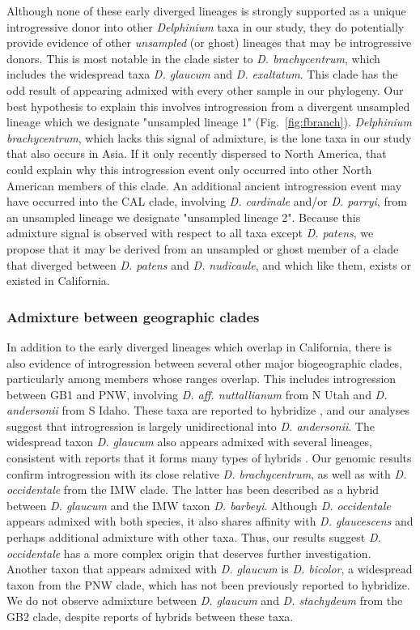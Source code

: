 \documentclass[11pt]{article}
\begin{document}
Although none of these early diverged lineages is strongly supported as a unique introgressive donor into other \emph{Delphinium} taxa in our study, they do potentially provide evidence of other \emph{unsampled} (or ghost) lineages that may be introgressive donors.
This is most notable in the clade sister to \emph{D. brachycentrum}, which includes 
the widespread taxa \emph{D. glaucum} and \emph{D. exaltatum}. 
This clade has the odd result of appearing admixed with every other sample in our 
phylogeny.
Our best hypothesis to explain this involves introgression from a divergent unsampled
lineage which we designate "unsampled lineage 1" (Fig.~\ref{fig:fbranch}). 
% 
\emph{Delphinium brachycentrum}, which lacks this signal of admixture, is the lone taxa in our
study that also occurs in Asia. If it only recently dispersed to North America, that 
could explain why this introgression event only occurred into other North American 
members of this clade.
% 
An additional ancient introgression event may have occurred into the CAL clade, 
involving \emph{D. cardinale} and/or \emph{D. parryi}, from an unsampled lineage we 
designate "unsampled lineage 2". Because this admixture signal is observed with respect to all taxa except \emph{D. patens}, we propose that it may be derived from an unsampled or ghost member of a clade that diverged between \emph{D. patens} and \emph{D. nudicaule}, and which like them, exists or existed in California. 


\subsubsection{Admixture between geographic clades}
% 
In addition to the early diverged lineages which overlap in California, there is
also evidence of introgression between several other major biogeographic
clades, particularly among members whose ranges overlap.
% 
This includes introgression between GB1 and PNW, involving \emph{D. aff. nuttallianum}
from N Utah and \emph{D. andersonii} from S Idaho. These taxa are reported to 
hybridize \citep{hickman1993jepson}, and our analyses suggest that introgression is largely unidirectional into \emph{D. andersonii}.
% 
The widespread taxon \emph{D. glaucum} also appears admixed with several lineages, 
consistent with reports that it forms many types of hybrids \citep{warnock_taxonomic_1995}.
Our genomic results confirm introgression with its close relative \emph{D. brachycentrum}, 
as well as with \emph{D. occidentale} from the IMW clade. 
The latter has been described as a hybrid between \emph{D. glaucum} and the 
IMW taxon \emph{D. barbeyi}. Although \emph{D. occidentale} appears admixed with both
species, it also shares affinity with \emph{D. glaucescens} and perhaps additional 
admixture with other taxa. Thus, our results suggest \emph{D. occidentale} has a more 
complex origin that deserves further investigation.
% 
Another taxon that appears admixed with \emph{D. glaucum} is \emph{D. bicolor},
a widespread taxon from the PNW clade, which has not been previously 
reported to hybridize. 
We do not observe admixture between \emph{D. glaucum} and \emph{D. stachydeum} 
from the GB2 clade, despite reports of hybrids between these taxa.
% 
\end{document}

